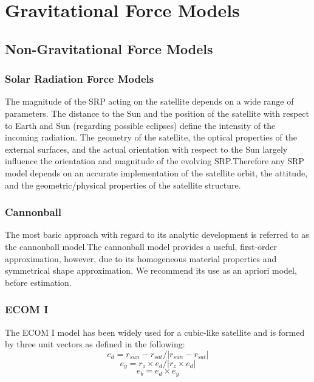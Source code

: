 \chapter{Gravitational Force Models}

\section{Non-Gravitational Force Models}

\subsection{Solar Radiation Force Models}
The magnitude of the SRP acting on the satellite depends on a wide range of parameters. 
The distance to the Sun and the position of the satellite with respect to Earth and Sun (regarding possible eclipses) define the intensity of the incoming radiation.
The geometry of the satellite, the optical properties of the external surfaces, and the actual orientation with respect to the Sun largely influence the orientation and magnitude of the evolving SRP.Therefore any SRP model depends on an accurate implementation of the satellite orbit, the attitude, and the geometric/physical properties of the satellite structure.
 
\subsection{Cannonball}
\label{sec:cannonball_srp}
The most basic approach with regard to its analytic development is referred to as the cannonball
model.The cannonball model provides a useful, first-order approximation, however, due to its homogeneous material properties and symmetrical shape approximation. We recommend its use as an apriori model, before estimation.

\subsection{ECOM I}
The ECOM I model has been widely used for a cubic-like satellite and is formed by three unit vectors as defined in the following: 
\begin{equation}
e_d = r_{sun} - r_{sat} / |r_{sun} - r_{sat}|
\end{equation}
\begin{equation}
e_y = r_z \times e_d / |r_z \times e_d|
\end{equation}
\begin{equation}
e_b = e_d \times e_y 
\end{equation}

